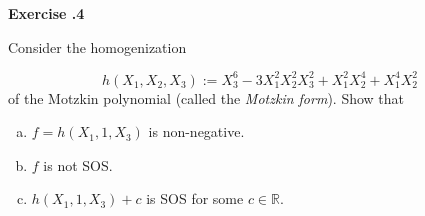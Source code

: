 \documentclass{imo_en}
\newcommand{\R}{\mathbb{R}}
\begin{document}
\bigskip


{\large \textbf{Exercise \thesheetnumber .4}} \bigskip 

Consider the homogenization

$$ h(X_1, X_2, X_3):= X_3^6 - 3X_1^2 X_2^2 X_3^2 + X_1^2 X_2^4 + X_1^4 X_2^2 $$
of the Motzkin polynomial (called the \emph{Motzkin form}). Show that

\begin{enumerate}[a)]
	\item $f = h(X_1 , 1, X_3 )$ is non-negative.
	\item $f$ is not SOS.
	\item $h(X_1, 1, X_3) + c$ is SOS for some $c \in \R$.
\end{enumerate}

\bigskip


%
\end{document}
